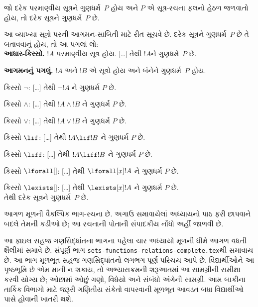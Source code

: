 \begin{defn}[સૂત્રો પર આગમન]
જો દરેક પરમાણ્વીય સૂત્રને ગુણધર્મ~$P$ હોય અને
$P$ એ સૂત્ર-રચના ફલનો હેઠળ જળવાતો હોય,
તો દરેક સૂત્રને ગુણધર્મ~$P$ છે.
\end{defn}

\begin{explain}
આ વ્યાખ્યા સૂત્રો પરની આગમન-સાબિતી માટે રીત સૂચવે છે.
દરેક સૂત્રને ગુણધર્મ~$P$ છે તે બતાવવાનું હોય,
તો આ પગલાં લો:\\

\textbf{આધાર-કિસ્સો.} $!A$ પરમાણ્વીય સૂત્ર હોય.
[\ldots] તેથી $!A$ને ગુણધર્મ~$P$ છે.

\textbf{આગમનનું પગલું.} $!A$ અને $!B$ એ સૂત્રો હોય
અને બંનેને ગુણધર્મ~$P$ હોય.

કિસ્સો $\lnot$: [\ldots] તેથી $\lnot !A$ ને ગુણધર્મ $P$ છે.

કિસ્સો $\land$: [\ldots] તેથી $!A \land !B$ ને ગુણધર્મ $P$ છે.

કિસ્સો $\lor$: [\ldots] તેથી $!A \lor !B$ ને ગુણધર્મ $P$ છે.

કિસ્સો $\lif$: [\ldots] તેથી $!A \lif !B$ ને ગુણધર્મ $P$ છે.

કિસ્સો $\liff$: [\ldots] તેથી $!A \liff !B$ ને ગુણધર્મ $P$ છે.

કિસ્સો $\lforall[]$: [\ldots] તેથી $\lforall[x] !A$ ને ગુણધર્મ $P$ છે.

કિસ્સો $\lexists[]$: [\ldots] તેથી $\lexists[x] !A$ ને ગુણધર્મ $P$ છે. \\

તેથી દરેક સૂત્રને ગુણધર્મ~$P$ છે.
\end{explain}
\endgroup

\begin{editorial}
આગળ મૂળની વૈકલ્પિક ભાગ-રચના છે. અગાઉ સમાવાયેલાં અધ્યાયનો પાઠ ફરી છાપવાને બદલે તેમની કડીઓ છે; આ રચનાની પોતાની સંપાદકીય નોંધો અહીં જાળવી છે.
\end{editorial}
\begingroup
\makeatletter{}\makeatother

\label{guunit:OLP-0720}


\begin{editorial}
  આ ફાઇલ સહજ ગણસિદ્ધાંતના ભાગના પહેલા ચાર અધ્યાયો
  મૂળની ધીમે આગળ વધતી શૈલીમાં સમાવે છે.
  સંપૂર્ણ ભાગ \verb|sets-functions-relations-complete.tex|થી સમાવાય છે.
  આ ભાગ મૂળભૂત સહજ ગણસિદ્ધાંતનો લગભગ પૂર્ણ પરિચય આપે છે.
  વિદ્યાર્થીઓને આ પૃષ્ઠભૂમિ છે એમ માની ન શકાય,
  તો અભ્યાસક્રમની શરૂઆતમાં આ સામગ્રીની સમીક્ષા કરવી યોગ્ય છે;
  ઓછામાં ઓછું ગણો, વિધેયો અને સંબંધો અંગેની સામગ્રી.
  આમ બાકીના તાર્કિક વિભાગો માટે જરૂરી ગણિતીય સંકેતો વાપરવાની
  મૂળભૂત આવડત બધા વિદ્યાર્થીઓ પાસે હોવાની ખાતરી થશે.
\end{editorial}

